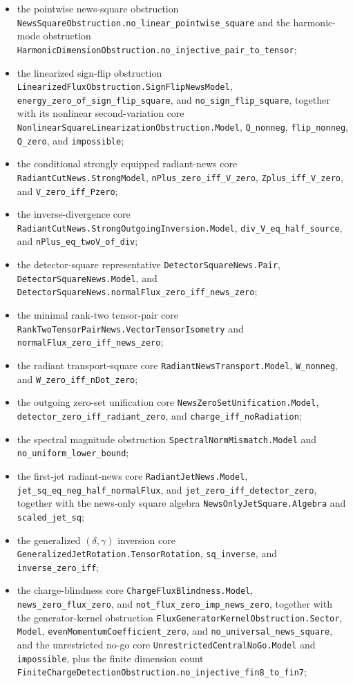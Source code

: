 \documentclass[11pt,a4paper]{article}
\begin{document}
\begin{itemize}
  \item the pointwise news-square obstruction \texttt{NewsSquareObstruction.no\_linear\_pointwise\_square} and the harmonic-mode obstruction \texttt{HarmonicDimensionObstruction.no\_injective\_pair\_to\_tensor};
  \item the linearized sign-flip obstruction \texttt{LinearizedFluxObstruction.SignFlipNewsModel}, \texttt{energy\_zero\_of\_sign\_flip\_square}, and \texttt{no\_sign\_flip\_square}, together with its nonlinear second-variation core \texttt{NonlinearSquareLinearizationObstruction.Model}, \texttt{Q\_nonneg}, \texttt{flip\_nonneg}, \texttt{Q\_zero}, and \texttt{impossible};
  \item the conditional strongly equipped radiant-news core \texttt{RadiantCutNews.StrongModel}, \texttt{nPlus\_zero\_iff\_V\_zero}, \texttt{Zplus\_iff\_V\_zero}, and \texttt{V\_zero\_iff\_Pzero};
  \item the inverse-divergence core \texttt{RadiantCutNews.StrongOutgoingInversion.Model}, \texttt{div\_V\_eq\_half\_source}, and \texttt{nPlus\_eq\_twoV\_of\_div};
  \item the detector-square representative \texttt{DetectorSquareNews.Pair}, \texttt{DetectorSquareNews.Model}, and \texttt{DetectorSquareNews.normalFlux\_zero\_iff\_news\_zero};
  \item the minimal rank-two tensor-pair core \texttt{RankTwoTensorPairNews.VectorTensorIsometry} and \texttt{normalFlux\_zero\_iff\_news\_zero};
  \item the radiant transport-square core \texttt{RadiantNewsTransport.Model}, \texttt{W\_nonneg}, and \texttt{W\_zero\_iff\_nDot\_zero};
  \item the outgoing zero-set unification core \texttt{NewsZeroSetUnification.Model}, \texttt{detector\_zero\_iff\_radiant\_zero}, and \texttt{charge\_iff\_noRadiation};
  \item the spectral magnitude obstruction \texttt{SpectralNormMismatch.Model} and \texttt{no\_uniform\_lower\_bound};
  \item the first-jet radiant-news core \texttt{RadiantJetNews.Model}, \texttt{jet\_sq\_eq\_neg\_half\_normalFlux}, and \texttt{jet\_zero\_iff\_detector\_zero}, together with the news-only square algebra \texttt{NewsOnlyJetSquare.Algebra} and \texttt{scaled\_jet\_sq};
  \item the generalized \((\delta,\gamma)\) inversion core \texttt{GeneralizedJetRotation.TensorRotation}, \texttt{sq\_inverse}, and \texttt{inverse\_zero\_iff};
  \item the charge-blindness core \texttt{ChargeFluxBlindness.Model}, \texttt{news\_zero\_flux\_zero}, and \texttt{not\_flux\_zero\_imp\_news\_zero}, together with the generator-kernel obstruction \texttt{FluxGeneratorKernelObstruction.Sector}, \texttt{Model}, \texttt{evenMomentumCoefficient\_zero}, and \texttt{no\_universal\_news\_square}, and the unrestricted no-go core \texttt{UnrestrictedCentralNoGo.Model} and \texttt{impossible}, plus the finite dimension count \texttt{FiniteChargeDetectionObstruction.no\_injective\_fin8\_to\_fin7};

\end{itemize}
\end{document}
